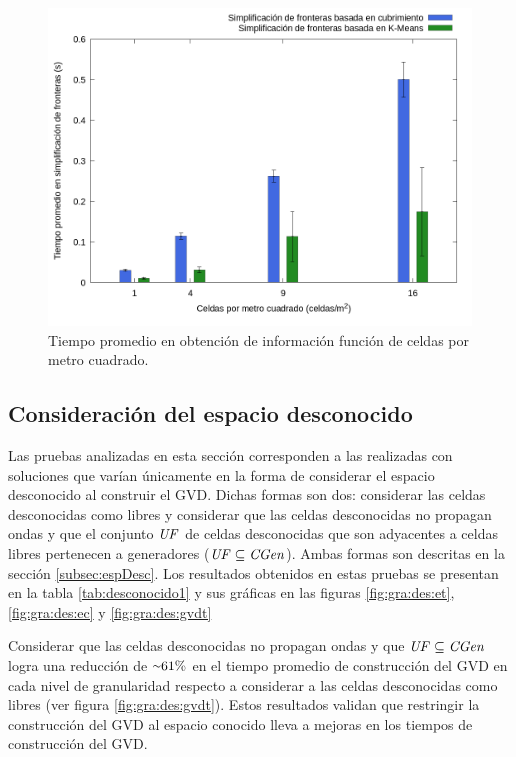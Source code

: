 \begin{figure}[H]
  \centerfloat

  \includegraphics[clip=true, width=\graphlen]{imagenes/graficas_chicas/graficas_histo_num/ident_obj/obj_id_time_mean.png}

  \caption{Tiempo promedio en obtención de información función de celdas por metro cuadrado.}\label{fig:gra:idobj:iobt}

\end{figure}

\subsection{Consideración del espacio desconocido}\label{sec:exp:desco}

Las pruebas analizadas en esta sección corresponden a las realizadas con
soluciones que varían únicamente en la forma de considerar el espacio
desconocido al construir el GVD. Dichas formas son dos: considerar las
celdas desconocidas como libres y considerar que las celdas desconocidas no
propagan ondas y que el conjunto $\mathit{UF}$ de celdas desconocidas que son
adyacentes a celdas libres pertenecen a generadores ($\mathit{UF} \subseteq
\mathit{CGen}$). Ambas formas son descritas en la sección \ref{subsec:espDesc}. Los
resultados obtenidos en estas pruebas se presentan en la tabla \ref{tab:desconocido1} y sus
gráficas en las figuras \ref{fig:gra:des:et}, \ref{fig:gra:des:ec} y
\ref{fig:gra:des:gvdt}



Considerar que las celdas desconocidas no propagan ondas y que $\mathit{UF}
\subseteq \mathit{CGen}$ logra una reducción de ${\smallsim}61\%$ en el tiempo
promedio de construcción del GVD en cada nivel de granularidad respecto a
considerar a las celdas desconocidas como libres (ver figura \ref{fig:gra:des:gvdt}). Estos resultados validan que
restringir la construcción del GVD al espacio conocido lleva a mejoras en los
tiempos de construcción del GVD. 


